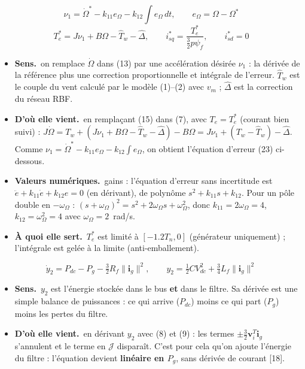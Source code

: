 \documentclass[11pt,a4paper]{article}
\newcommand{\bv}[1]{\mathbf{#1}}
\newcommand{\Jm}{\boldsymbol{\mathcal{J}}}
\newenvironment{expl}{\begin{itemize}[leftmargin=1.2em,itemsep=2pt,topsep=2pt]}{\end{itemize}}
\newcommand{\sens}{\item \textbf{Sens.}~}
\newcommand{\origine}{\item \textbf{D'où elle vient.}~}
\newcommand{\num}{\item \textbf{Valeurs numériques.}~}
\newcommand{\role}{\item \textbf{À quoi elle sert.}~}
\begin{document}
\begin{equation}\tag{14}
\nu_1=\dot\Omega^*-k_{11}e_\Omega-k_{12}\!\int\!e_\Omega\,dt,\qquad e_\Omega=\Omega-\Omega^*
\end{equation}
\begin{equation}\tag{15}
T_e^* = J\nu_1 + B\Omega - \hat T_w - \hat\Delta,\qquad i_{sq}^*=\frac{T_e^*}{\frac32p\psi_f},\qquad i_{sd}^*=0
\end{equation}
\begin{expl}
\sens on remplace $\dot\Omega$ dans (13) par une accélération \og désirée\fg{} $\nu_1$ : la dérivée de la
référence plus une correction proportionnelle et intégrale de l'erreur. $\hat T_w$ est le couple du vent
calculé par le modèle (1)--(2) avec $v_m$ ; $\hat\Delta$ est la correction du réseau RBF.
\origine en remplaçant (15) dans (7), avec $T_e=T_e^*$ (courant bien suivi) :
$J\dot\Omega=T_w+(J\nu_1+B\Omega-\hat T_w-\hat\Delta)-B\Omega=J\nu_1+(T_w-\hat T_w)-\hat\Delta$.
Comme $\nu_1=\dot\Omega^*-k_{11}e_\Omega-k_{12}\int e_\Omega$, on obtient l'équation d'erreur (23) ci-dessous.
\num gains : l'équation d'erreur sans incertitude est $\ddot e+k_{11}\dot e+k_{12}e=0$ (en dérivant), de
polynôme $s^2+k_{11}s+k_{12}$. Pour un pôle double en $-\omega_\Omega$ : $(s+\omega_\Omega)^2=s^2+2\omega_\Omega s+\omega_\Omega^2$,
donc $k_{11}=2\omega_\Omega=4$, $k_{12}=\omega_\Omega^2=4$ avec $\omega_\Omega=2$~rad/s.
\role $T_e^*$ est limité à $[-1.2T_n,0]$ (générateur uniquement) ; l'intégrale est gelée à la limite
(anti-emballement).
\end{expl}

\begin{equation}\tag{16}
\dot y_2 = P_{dc} - P_g - \tfrac32R_f\|\bv{i}_g\|^2,\qquad y_2=\tfrac12CV_{dc}^2+\tfrac34L_f\|\bv i_g\|^2
\end{equation}
\begin{expl}
\sens $y_2$ est l'énergie stockée dans le bus \textbf{et} dans le filtre. Sa dérivée est une simple balance
de puissances : ce qui arrive ($P_{dc}$) moins ce qui part ($P_g$) moins les pertes du filtre.
\origine en dérivant $y_2$ avec (8) et (9) : les termes $\pm\frac32\bv v_i^T\bv i_g$ s'annulent et le
terme en $\Jm$ disparaît. C'est pour cela qu'on ajoute l'énergie du filtre : l'équation devient
\textbf{linéaire en $P_g$}, sans dérivée de courant [18].
\end{expl}
\end{document}
